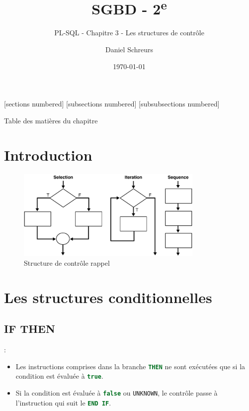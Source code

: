 \documentclass[10pt]{beamer}
\title{SGBD - 2\textsuperscript{e}}
\subtitle{PL-SQL - Chapitre 3 - Les structures de contrôle}
\date{\today}
\author{Daniel Schreurs}
\institute{Haute École de Province de Liège}
\begin{document}
\maketitle

[sections numbered]
[subsections numbered]
[subsubsections numbered]
\begin{frame}[allowframebreaks]{Table des matières du chapitre}
    \tableofcontents[subsectionstyle=show/show/hide,subsubsectionstyle=show/show/hide,]
\end{frame}

\section{Introduction}
\tocss
\begin{frame}{\secname}
    \begin{figure}
        \begin{center}
            \includegraphics[width=0.8\textwidth]{../assets/img/structure-controle-rappel.png}
            \caption{Structure de contrôle rappel}
        \end{center}
    \end{figure}
\end{frame}

\section{Les structures conditionnelles}
\tocss
\subsection{IF THEN}
\begin{frame}{\secname : \subsecname}
    \begin{itemize}
        \item   Les instructions comprises dans la branche \lstinline[language=sql]!THEN! ne sont exécutées que si la condition est évaluée à \lstinline[language=sql]!true!.
        \item Si la condition est évaluée à \lstinline[language=sql]!false! ou \lstinline[language=sql]!UNKNOWN!, le contrôle passe à l'instruction qui suit le \lstinline[language=sql]!END IF!.
    \end{itemize}
\end{frame}
\end{document}
